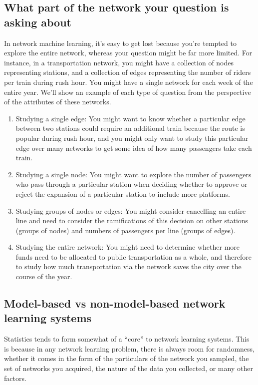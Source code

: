 \subsection{What part of the network your question is asking about}

In network machine learning, it’s easy to get lost because you're tempted to explore the entire network, whereas your question might be far more limited. For instance, in a transportation network, you might have a collection of nodes representing stations, and a collection of edges representing the number of riders per train during rush hour. You might have a single network for each week of the entire year. We’ll show an example of each type of question from the perspective of the attributes of these networks. 
\begin{enumerate}
    \item Studying a single edge: You might want to know whether a particular edge between two stations could require an additional train because the route is popular during rush hour, and you might only want to study this particular edge over many networks to get some idea of how many passengers take each train.
    \item Studying a single node: You might want to explore the number of passengers who pass through a particular station when deciding whether to approve or reject the expansion of a particular station to include more platforms.
    \item Studying groups of nodes or edges: You might consider cancelling an entire line and need to consider the ramifications of this decision on other stations (groups of nodes) and numbers of passengers per line (groups of edges).
    \item Studying the entire network: You might need to determine whether more funds need to be allocated to public transportation as a whole, and therefore to study how much transportation via the network saves the city over the course of the year.
\end{enumerate}


\subsection{Model-based vs non-model-based network learning systems}

Statistics tends to form somewhat of a ``core'' to network learning systems. This is because in any network learning problem, there is always room for randomness, whether it comes in the form of the particulars of the network you sampled, the set of networks you acquired, the nature of the data you collected, or many other factors. 

